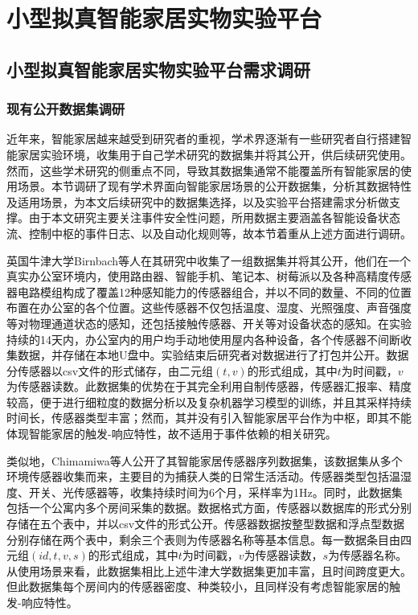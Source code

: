 \chapter{小型拟真智能家居实物实验平台}

\section{小型拟真智能家居实物实验平台需求调研}


\subsection{现有公开数据集调研}

近年来，智能家居越来越受到研究者的重视，学术界逐渐有一些研究者自行搭建智能家居实验环境，收集用于自己学术研究的数据集并将其公开，供后续研究使用。然而，这些学术研究的侧重点不同，导致其数据集通常不能覆盖所有智能家居的使用场景。本节调研了现有学术界面向智能家居场景的公开数据集，分析其数据特性及适用场景，为本文后续研究中的数据集选择，以及实验平台搭建需求分析做支撑。由于本文研究主要关注事件安全性问题，所用数据主要涵盖各智能设备状态流、控制中枢的事件日志、以及自动化规则等，故本节着重从上述方面进行调研。

英国牛津大学Birnbach等人在其研究中收集了一组数据集并将其公开，他们在一个真实办公室环境内，使用路由器、智能手机、笔记本、树莓派以及各种高精度传感器电路模组构成了覆盖12种感知能力的传感器组合，并以不同的数量、不同的位置布置在办公室的各个位置。这些传感器不仅包括温度、湿度、光照强度、声音强度等对物理通道状态的感知，还包括接触传感器、开关等对设备状态的感知。在实验持续的14天内，办公室内的用户均手动地使用屋内各种设备，各个传感器不间断收集数据，并存储在本地U盘中。实验结束后研究者对数据进行了打包并公开。数据分传感器以csv文件的形式储存，由二元组$(t,v)$的形式组成，其中$t$为时间戳，$v$为传感器读数。此数据集的优势在于其完全利用自制传感器，传感器汇报率、精度较高，便于进行细粒度的数据分析以及复杂机器学习模型的训练，并且其采样持续时间长，传感器类型丰富；然而，其并没有引入智能家居平台作为中枢，即其不能体现智能家居的触发-响应特性，故不适用于事件依赖的相关研究。

类似地，Chimamiwa等人公开了其智能家居传感器序列数据集，该数据集从多个环境传感器收集而来，主要目的为捕获人类的日常生活活动。传感器类型包括温湿度、开关、光传感器等，收集持续时间为6个月，采样率为1Hz。同时，此数据集包括一个公寓内多个房间采集的数据。数据格式方面，传感器以数据库的形式分别存储在五个表中，并以csv文件的形式公开。传感器数据按整型数据和浮点型数据分别存储在两个表中，剩余三个表则为传感器名称等基本信息。每一数据条目由四元组$(id,t,v,s)$的形式组成，其中$t$为时间戳，$v$为传感器读数，$s$为传感器名称。从使用场景来看，此数据集相比上述牛津大学数据集更加丰富，且时间跨度更大。但此数据集每个房间内的传感器密度、种类较小，且同样没有考虑智能家居的触发-响应特性。

